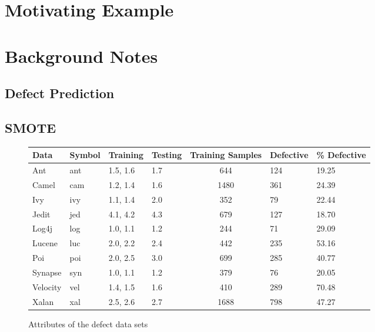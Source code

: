 \documentclass[12pt, journal, compsoc]{IEEEtran}
\begin{document}
\section{Motivating Example}
\label{motivation}
\section{Background Notes}
\label{back}
\subsection{Defect Prediction}
\subsection{SMOTE}
\begin{figure}[!tb]
  \renewcommand{\baselinestretch}{1.25}\begin{center}
    {\tiny
      \begin{tabular}{l@{~~~}l@{~~~}l@{~~~}l@{~~~}c@{~~~}l@{~~~}l@{~~~}}
        \hline
        \rowcolor{lightgray}
        Data & Symbol & Training & Testing & Training Samples& Defective &\% Defective \\\hline
        
        Ant & ant & 1.5, 1.6  &1.7 & 644&124&19.25\\
        
        Camel & cam & 1.2, 1.4 & 1.6 & 1480&361 & 24.39\\
        
        Ivy & ivy & 1.1, 1.4 & 2.0  & 352 & 79 & 22.44\\
        
        Jedit & jed & 4.1, 4.2 & 4.3 & 679 & 127 & 18.70\\
        
        Log4j & log & 1.0, 1.1 & 1.2 & 244 & 71 & 29.09\\
        
        Lucene & luc & 2.0, 2.2 & 2.4 & 442 & 235 & 53.16\\
        
        Poi & poi & 2.0, 2.5 & 3.0 & 699 & 285 & 40.77\\
        
        Synapse & syn & 1.0, 1.1 & 1.2 & 379 & 76 & 20.05\\
        
        Velocity & vel & 1.4, 1.5 & 1.6 & 410& 289 & 70.48\\
        
        Xalan & xal &2.5, 2.6 &2.7 & 1688 & 798 & 47.27\\\hline
      \end{tabular}}
    \end{center}
    \caption{Attributes of the defect data sets}\label{fig:ck}
  \end{figure}
\end{document}
